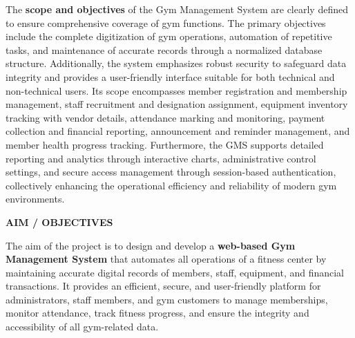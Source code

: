 \documentclass[12pt,a4paper]{report}
\begin{document}
The \textbf{scope and objectives} of the Gym Management System are clearly defined to ensure comprehensive coverage of gym functions. The primary objectives include the complete digitization of gym operations, automation of repetitive tasks, and maintenance of accurate records through a normalized database structure. Additionally, the system emphasizes robust security to safeguard data integrity and provides a user-friendly interface suitable for both technical and non-technical users. Its scope encompasses member registration and membership management, staff recruitment and designation assignment, equipment inventory tracking with vendor details, attendance marking and monitoring, payment collection and financial reporting, announcement and reminder management, and member health progress tracking. Furthermore, the GMS supports detailed reporting and analytics through interactive charts, administrative control settings, and secure access management through session-based authentication, collectively enhancing the operational efficiency and reliability of modern gym environments.

\newpage
\vspace*{\fill}
\begin{center}
{\LARGE \textbf{AIM / OBJECTIVES}}
\end{center}
\vspace*{\fill}

\newpage
The aim of the project is to design and develop a \textbf{web-based Gym Management System} that automates all operations of a fitness center by maintaining accurate digital records of members, staff, equipment, and financial transactions. It provides an efficient, secure, and user-friendly platform for administrators, staff members, and gym customers to manage memberships, monitor attendance, track fitness progress, and ensure the integrity and accessibility of all gym-related data.
\end{document}
